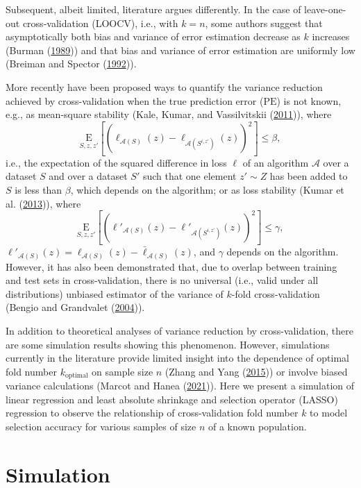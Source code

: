 \documentclass[
  12pt,
]{article}
\begin{document}
Subsequent, albeit limited, literature argues differently. In the case
of leave-one-out cross-validation (LOOCV), i.e., with \(k = n\), some
authors suggest that asymptotically both bias and variance of error
estimation decrease as \(k\) increases (Burman
(\protect\hyperlink{ref-Burman1989}{1989})) and that bias and variance
of error estimation are uniformly low (Breiman and Spector
(\protect\hyperlink{ref-Breiman1992}{1992})).

More recently have been proposed ways to quantify the variance reduction
achieved by cross-validation when the true prediction error
(\(\mathrm{PE}\)) is not known, e.g., as mean-square stability (Kale,
Kumar, and Vassilvitskii (\protect\hyperlink{ref-Kale2011}{2011})),
where
\[\underset{S,z,z'}{\mathrm{E}}[(\ell_{\mathcal A(S)}(z) - \ell_{\mathcal A(S^{i,z'})}(z))^2] \le \beta,\]
i.e., the expectation of the squared difference in loss \(\ell\) of an
algorithm \(\mathcal A\) over a dataset \(S\) and over a dataset \(S'\)
such that one element \(z' \sim Z\) has been added to \(S\) is less than
\(\beta\), which depends on the algorithm; or as loss stability (Kumar
et al. (\protect\hyperlink{ref-Kumar2013}{2013})), where
\[\underset{S,z,z'}{\mathrm{E}}[(\ell'_{\mathcal A(S)}(z) - \ell'_{\mathcal A(S^{i,z'})}(z))^2] \le \gamma,\]
\(\ell'_{\mathcal A(S)}(z) = \ell_{\mathcal A(S)}(z) - \bar{\ell}_{\mathcal A(S)}(z)\),
and \(\gamma\) depends on the algorithm. However, it has also been
demonstrated that, due to overlap between training and test sets in
cross-validation, there is no universal (i.e., valid under all
distributions) unbiased estimator of the variance of \(k\)-fold
cross-validation (Bengio and Grandvalet
(\protect\hyperlink{ref-Bengio2004}{2004})).

In addition to theoretical analyses of variance reduction by
cross-validation, there are some simulation results showing this
phenomenon. However, simulations currently in the literature provide
limited insight into the dependence of optimal fold number
\(k_\mathrm{optimal}\) on sample size \(n\) (Zhang and Yang
(\protect\hyperlink{ref-Zhang2015}{2015})) or involve biased variance
calculations (Marcot and Hanea
(\protect\hyperlink{ref-Marcot2021}{2021})). Here we present a
simulation of linear regression and least absolute shrinkage and
selection operator (LASSO) regression to observe the relationship of
cross-validation fold number \(k\) to model selection accuracy for
various samples of size \(n\) of a known population.

\hypertarget{simulation}{%
\section{Simulation}\label{simulation}}
\end{document}
